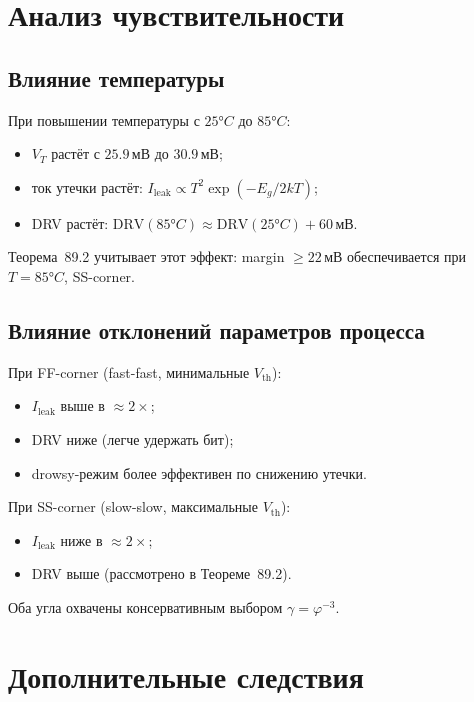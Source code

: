 \section{Анализ чувствительности}
\label{sec:glava89-sensitivity}

\subsection{Влияние температуры}

При повышении температуры с $25°C$ до $85°C$:
\begin{itemize}
  \item $V_T$ растёт с $25.9\,\text{мВ}$ до $30.9\,\text{мВ}$;
  \item ток утечки растёт: $I_\mathrm{leak} \propto T^2 \exp(-E_g/2kT)$;
  \item DRV растёт: $\mathrm{DRV}(85°C) \approx \mathrm{DRV}(25°C) + 60\,\text{мВ}$.
\end{itemize}
Теорема~89.2 учитывает этот эффект: margin $\geq 22\,\text{мВ}$
обеспечивается при $T = 85°C$, SS-corner.

\subsection{Влияние отклонений параметров процесса}

При FF-corner (fast-fast, минимальные $V_\mathrm{th}$):
\begin{itemize}
  \item $I_\mathrm{leak}$ выше в $\approx 2\times$;
  \item DRV ниже (легче удержать бит);
  \item drowsy-режим более эффективен по снижению утечки.
\end{itemize}
При SS-corner (slow-slow, максимальные $V_\mathrm{th}$):
\begin{itemize}
  \item $I_\mathrm{leak}$ ниже в $\approx 2\times$;
  \item DRV выше (рассмотрено в Теореме~89.2).
\end{itemize}
Оба угла охвачены консервативным выбором $\gamma = \varphi^{-3}$.

\section{Дополнительные следствия}
\label{sec:glava89-corollaries}

